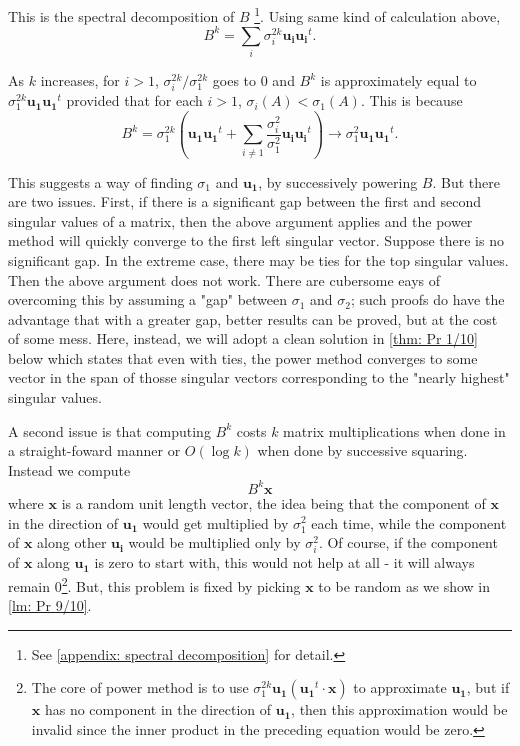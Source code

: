 This is the spectral decomposition of \(B\) \footnote{See \autoref{appendix: spectral decomposition} for detail.}. Using same kind of calculation above,
\[
  B^k = \sum_{i} \sigma _i^{2k} \mathbf{u_i} \mathbf{u_i}^t.   
\] 

As \(k\) increases, for \(i>1\), \(\sigma _i^{2k} / \sigma _1^{2k} \) goes to \(0\) and \(B^k\) is approximately equal to \(\sigma _1^{2k} \mathbf{u_1} \mathbf{u_1}^t  \)  provided that for each \(i>1\), \(\sigma _i (A)  < \sigma _1 (A)\).  This is because 
\[
  B^k = \sigma _1^{2k} \left( \mathbf{u_1} \mathbf{u_1}^t + \sum_{i \neq 1} \frac{\sigma_i^2}{\sigma _1^2} \mathbf{u_i} \mathbf{u_i}^t     \right) \to \sigma _1^2 \mathbf{u_1} \mathbf{u_1}^t.  
\]

This suggests a way of finding \(\sigma _1\) and \(\mathbf{u_1} \), by successively powering \(B\). But there are two issues. First, if there is a significant gap between the first and second singular values of a matrix, then the above argument applies and the power method will quickly converge to the first left singular vector.   Suppose there is no significant gap. In the extreme case, there may be ties for the top singular values. Then the above argument does not work. There are cubersome eays of overcoming this by assuming a "gap" between \(\sigma _1\) and \(\sigma _2\); such proofs do have the advantage that with a greater gap, better results can be proved, but at the cost of some mess. Here, instead, we will adopt a clean solution in \autoref{thm: Pr 1/10} below which states that even with ties, the power method converges to some vector in the span of thosse singular vectors corresponding to the "nearly highest" singular values. 

A second issue is that computing \(B^k\) costs \(k\) matrix multiplications when done in a straight-foward manner or \(O(\log k)\) when done by successive squaring. Instead we compute 
\[
  B^k \mathbf{x} 
\]   where \(\mathbf{x} \) is a random unit length vector, the idea being that the component of \(\mathbf{x} \) in the direction of \(\mathbf{u_1} \) would get multiplied by \(\sigma _1^2\) each time, while the component of \(\mathbf{x} \) along other \(\mathbf{u_i} \) would be multiplied only by \(\sigma _i^2\). Of course, if the component of \(\mathbf{x} \) along \(\mathbf{u_1} \) is zero to start with, this would not help at all - it will always remain \(0\)\footnote{The core of power method is to use \(\sigma _1^{2k} \mathbf{u_1} \left( \mathbf{u_1}^t \cdot \mathbf{x}   \right)  \) to approximate \(\mathbf{u_1} \), but if \(\mathbf{x} \) has no component in the direction of \(\mathbf{u_1} \), then this approximation would be invalid since the inner product in the preceding equation would be zero.    }. But, this problem is fixed by picking \(\mathbf{x} \) to be random as we show in \autoref{lm: Pr 9/10}.

